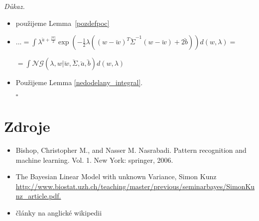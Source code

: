 \documentclass{article}
\newenvironment{pitemize}{
\begin{itemize}
  \setlength{\itemsep}{5pt}
  \setlength{\parskip}{0pt}
  \setlength{\parsep}{0pt}
}{\end{itemize}}
\newenvironment{pproof}{
\noindent\emph{Důkaz.}
\begin{pitemize}
}{\hfill$\square$\end{pitemize}}
\newcommand{\NoG}{\mathcal{NG}}
\theoremstyle{definition}
\begin{document}
\begin{pproof}
$\propto \int \lambda^{\left|y_{new}\right|/2+\left|w\right|/2+\hat{a}-1}\cdot$
\nopagebreak

$\exp\left(-\frac{1}{2}\lambda\left(\left(y_{new}-\Phi_{new}w\right)^T
\left(y_{new}-\Phi_{new}w\right)
+\left(w-\hat{w}\right)^T\hat{\Sigma}
\left(w-\hat{w}\right)+2\hat{b}
\right)\right)d(w,\lambda)$


\item použijeme Lemma~\ref{pozdefpoc}

\item $...=\int \lambda^{\breve{a}+\frac{|w|}{2}}
\exp \left(-\frac{1}{2}\lambda\left(\left(w-\breve{w}\right)^T {\breve{\Sigma}}^{-1}\left(w- \breve{w}\right)+2\breve{b}\right)\right)d(w,\lambda)=$

$=\int\NoG\left(\lambda,w|\breve w, \breve \Sigma, \breve a, \breve b\right)d(w,\lambda)$

\item Použijeme Lemma \ref{nedodelany_integral}.


\end{pproof}

\section{Zdroje}
\begin{itemize}
\item Bishop, Christopher M., and Nasser M. Nasrabadi. Pattern recognition and machine learning. Vol. 1. New York: springer, 2006.
\item
The Bayesian Linear Model with unknown
Variance, Simon Kunz \url{http://www.biostat.uzh.ch/teaching/master/previous/seminarbayes/SimonKunz_article.pdf.}

\item články na anglické wikipedii
\end{itemize}
\end{document}
